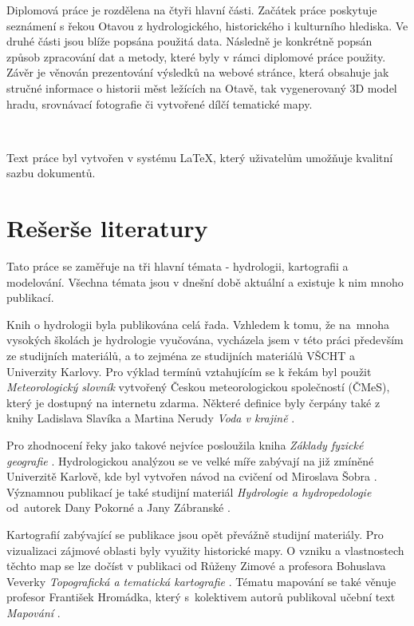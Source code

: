 \documentclass[thesis=M,czech]{FITthesis}[2012/06/26]
\begin{document}
\begin{introduction}
Diplomová práce je rozdělena na čtyři hlavní části. Začátek práce poskytuje seznámení s řekou Otavou z hydrologického, historického i kulturního hlediska. Ve druhé části jsou blíže popsána použitá data. Následně je konkrétně popsán způsob zpracování dat a metody, které byly v rámci diplomové práce použity. Závěr je věnován prezentování výsledků na webové stránce, která obsahuje jak stručné informace o historii měst ležících na Otavě, tak vygenerovaný 3D model hradu, srovnávací fotografie či vytvořené dílčí tematické mapy.

\

Text práce byl vytvořen v systému \LaTeX, který uživatelům umožňuje kvalitní sazbu dokumentů.


\end{introduction}

\chapter{Rešerše literatury}
Tato práce se zaměřuje na tři hlavní témata - hydrologii, kartografii a modelování. Všechna témata jsou v dnešní době aktuální a existuje k nim mnoho publikací.


Knih o hydrologii byla publikována celá řada. Vzhledem k tomu, že na~mnoha vysokých školách je hydrologie vyučována, vycházela jsem v této práci především ze studijních materiálů, a to zejména ze studijních materiálů VŠCHT a Univerzity Karlovy. Pro výklad termínů vztahujícím se k řekám byl použit \textit{Meteorologický slovník} \cite{meteo} vytvořený Českou meteorologickou společností (ČMeS), který je dostupný na internetu zdarma. Některé definice byly čerpány také z knihy Ladislava Slavíka a Martina Nerudy \textit{Voda v krajině} \cite{definiceHydro}. 


Pro zhodnocení řeky jako takové nejvíce posloužila kniha \textit{Základy fyzické geografie} \cite{FGkniha}. Hydrologickou analýzou se ve velké míře zabývají na již zmíněné Univerzitě Karlově, kde byl vytvořen návod na cvičení od Miroslava Šobra \cite{UK}. Významnou publikací je také studijní materiál \textit{Hydrologie a hydropedologie} od~autorek Dany Pokorné a Jany Zábranské \cite{hydrovscht}. 

Kartografií zabývající se publikace jsou opět převážně studijní materiály. Pro vizualizaci zájmové oblasti byly využity historické mapy. O vzniku a vlastnostech těchto map se lze dočíst v publikaci od Růženy Zimové a profesora Bohuslava Veverky \textit{Topografická a tematická kartografie} \cite{topo_skripta}. Tématu mapování se také věnuje profesor František Hromádka, který s~kolektivem autorů publikoval učební text \textit{Mapování} \cite{mapovani_brno}.
\end{document}
